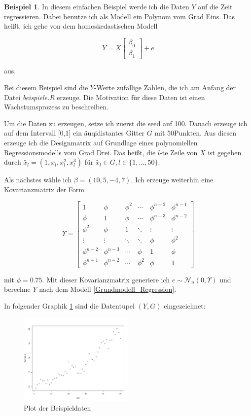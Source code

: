 \documentclass[12pt,a4paper]{article}
\theoremstyle{definition}
\newtheorem{Beispiel}[Definition]{Beispiel}
\theoremstyle{definition}
\theoremstyle{definition}
\newcommand{\seedexample}{100}
\newcommand{\nobs}{50}
\newcommand{\betatrue}{(10,5,-4,7)}
\newcommand{\phitrue}{0.75}
\newcommand{\betaone}[0]{\left[ \begin{array}{c} \beta_{0} \\ \beta_{1} \end{array} \right]}
\begin{document}
\begin{Beispiel}
In diesem einfachen Beispiel werde ich die Daten $Y$ auf die Zeit regressieren. Dabei benutze ich als Modell ein Polynom vom Grad Eins. Das heißt, ich gehe von dem homoskedastischen Modell

\begin{equation*}
Y =  X  \betaone + e 
\end{equation*}

aus.

Bei diesem Beispiel sind die $Y$-Werte zufällige Zahlen, die ich am Anfang der Datei \textit{beispiele.R} erzeuge. Die Motivation für diese Daten ist einen Wachstumsprozess zu beschreiben.

Um die Daten zu erzeugen, setze ich zuerst die seed auf \seedexample . Danach erzeuge ich auf dem Intervall [0,1] ein äuqidistantes Gitter $G$ mit \nobs  Punkten. Aus diesen erzeuge ich die Designmatrix auf Grundlage eines polynomiellen Regressionsmodells vom Grad Drei. Das heißt, die $l$-te Zeile von $X$ ist gegeben durch $\tilde{x_l} = (1, x_l, x_l^2, x_l^3)$ für $\tilde{x_l} \in G, l \in \{1, \ldots, \nobs\}$.

Als nächstes wähle ich $\beta = \betatrue$. Ich erzeuge weiterhin eine Kovarianzmatrix der Form 

\[
\Upsilon = 
\left[
   \begin{array}{cccccc}
     1 				& \phi 			& \phi^2	& \cdots	& \phi^{n-2}	& \phi^{n-1} 	\\
     \phi 			& 1		 		& \phi 		& \cdots	& \phi^{n-3}	& \phi^{n-2} 	\\
     \phi^2 		& \phi 			& 1		 	& \ddots	& \vdots		& \vdots 		\\
     \vdots		 	& \vdots	 	& \ddots	& \ddots	& \phi			& \phi^{2} 	\\
     \phi^{n-2} 	& \phi^{n-3}	& \cdots 	& \phi		& 1				& \phi 		\\
     \phi^{n-1} 	& \phi^{n-2} 	& \cdots	& \phi^{2}	& \phi			& 1  
   \end{array}
\right]
\]

mit $\phi = \phitrue$. Mit dieser Kovarianzmatrix generiere ich $e \sim \mathscr{N}_n(0,\Upsilon)$ und berechne $Y$ nach dem Modell \eqref{Grundmodell_Regression}.

In folgender Graphik \ref{Beispieldaten} sind die Datentupel $(Y,G)$ eingezeichnet:

\begin{figure}[H] 
  \centering
     \includegraphics[width=0.5\textwidth]{data-raw}
  \caption{Plot der Beispieldaten}
  \label{Beispieldaten}
\end{figure}


\end{Beispiel}
\end{document}

